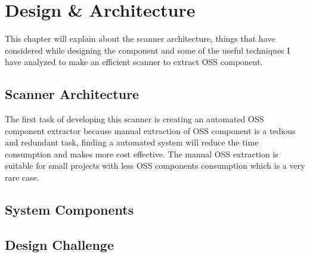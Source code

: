 %
\section{Design \& Architecture}\label{sec:design_architecture}
%
This chapter will explain about the scanner architecture, things that have considered while designing the component and some of the useful techniques I have analyzed to make an efficient scanner to extract \acs{OSS} component.

\subsection{Scanner Architecture}
 The first task of developing this scanner is creating an automated \acs{OSS} component extractor because manual extraction of \acs{OSS} component is a tedious and redundant task, finding a automated system will reduce the time consumption and makes more cost effective. The manual \acs{OSS} extraction is suitable for small projects with less \acs{OSS} components consumption which is a very rare case.  
\subsection{System Components}

\subsection{Design Challenge}
%
